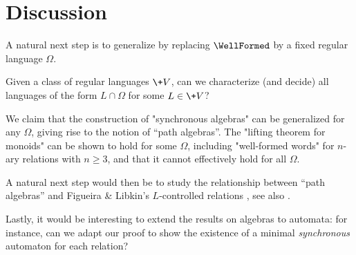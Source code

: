 \section{Discussion}
\label{sec:discussion}

A natural next step is to generalize  by replacing
$\WellFormed$ by a fixed regular language $\Omega$.

\begin{question}
	Given a class of regular languages $\+V$, can we characterize (and decide) all
	languages of the form $L \cap \Omega$ for some $L \in \+V$?
\end{question}

We claim that the construction of "synchronous algebras"
can be generalized for any $\Omega$, giving rise to the notion of ``path algebras''.
The "lifting theorem for monoids" can be shown to hold for some $\Omega$, including "well-formed words" for $n$-ary relations with $n\geq 3$, and that it cannot effectively hold for all $\Omega$.

A natural next step would then be to study the relationship between ``path algebras'' and
Figueira \& Libkin's $L$-controlled relations \cite[\S 3]{FigueiraLibkin2015SynchronizingRelations},
see also \cite{DescotteFigueiraPuppis2018ResynchronizingClasses}.

Lastly, it would be interesting to extend the results on algebras to automata: for instance, can
we adapt our proof to show the existence of a minimal \emph{synchronous} automaton for each relation?


